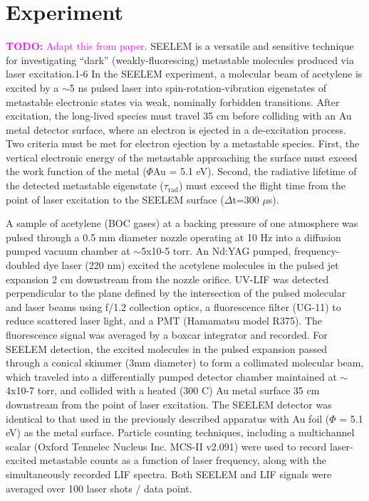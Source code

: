 \documentclass[12pt]{mitthesis}
\newcommand{\TODO} [1]{\textcolor{magenta}{\textbf{TODO:} #1}}
\begin{document}
\section{Experiment}

\TODO{Adapt this from paper.}  SEELEM is a versatile and sensitive
technique for investigating ``dark'' (weakly-fluorescing) metastable
molecules produced via laser excitation.1-6 In the SEELEM experiment,
a molecular beam of acetylene is excited by a $\sim$5 ns pulsed laser
into spin-rotation-vibration eigenstates of metastable electronic
states via weak, nominally forbidden transitions. After excitation,
the long-lived species must travel 35 cm before colliding with an Au
metal detector surface, where an electron is ejected in a
de-excitation process. Two criteria must be met for electron ejection
by a metastable species. First, the vertical electronic energy of the
metastable approaching the surface must exceed the work function of
the metal ($\Phi$Au = 5.1 eV). Second, the radiative lifetime of the
detected metastable eigenstate ($\tau_\text{rad}$) must exceed the
flight time from the point of laser excitation to the SEELEM surface
($\Delta$t=300 $\mu$s).

A sample of acetylene (BOC gases) at a backing pressure of one
atmosphere was pulsed through a 0.5 mm diameter nozzle operating at 10
Hz into a diffusion pumped vacuum chamber at $\sim$5x10-5 torr.  An Nd:YAG
pumped, frequency-doubled dye laser (220 nm) excited the acetylene
molecules in the pulsed jet expansion 2 cm downstream from the nozzle
orifice. UV-LIF was detected perpendicular to the plane defined by the
intersection of the pulsed molecular and laser beams using f/1.2
collection optics, a fluorescence filter (UG-11) to reduce scattered
laser light, and a PMT (Hamamatsu model R375). The fluorescence signal
was averaged by a boxcar integrator and recorded. For SEELEM
detection, the excited molecules in the pulsed expansion passed
through a conical skimmer (3mm diameter) to form a collimated
molecular beam, which traveled into a differentially pumped detector
chamber maintained at $\sim$4x10-7 torr, and collided with a heated (300
C) Au metal surface 35 cm downstream from the point of laser
excitation. The SEELEM detector was identical to that used in the
previously described apparatus with Au foil ($\Phi$ = 5.1 eV) as the
metal surface.  Particle counting techniques, including a multichannel
scalar (Oxford Tennelec Nucleus Inc. MCS-II v2.091) were used to
record laser-excited metastable counts as a function of laser
frequency, along with the simultaneously recorded LIF spectra. Both
SEELEM and LIF signals were averaged over 100 laser shots / data
point.
\end{document}
